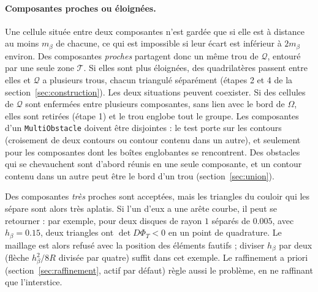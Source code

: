\documentclass[11pt,a4paper]{article}
\begin{document}
\paragraph{Composantes proches ou éloignées.} Une cellule située entre deux
composantes n'est gardée que si elle est à distance au moins $m_\beta$ de
chacune, ce qui est impossible si leur écart est inférieur à $2 m_\beta$
environ. Des composantes \emph{proches} partagent donc un même trou de
$\mathcal{Q}$, entouré par une seule zone $\mathcal{T}$. Si elles sont plus
éloignées, des quadrilatères passent entre elles et $\mathcal{Q}$ a
plusieurs trous, chacun triangulé séparément (étapes 2 et 4 de la
section~\ref{sec:construction}). Les deux situations peuvent coexister. Si
des cellules de $\mathcal{Q}$ sont enfermées entre plusieurs composantes,
sans lien avec le bord de $\Omega$, elles sont retirées (étape 1) et le trou
englobe tout le groupe. Les composantes d'un \texttt{MultiObstacle} doivent
être disjointes : le test porte sur les contours (croisement de deux
contours ou contour contenu dans un autre), et seulement pour les
composantes dont les boîtes englobantes se rencontrent. Des obstacles qui se
chevauchent sont d'abord réunis en une seule composante, et un contour
contenu dans un autre peut être le bord d'un trou
(section~\ref{sec:union}).

Des composantes \emph{très} proches sont acceptées, mais les triangles du
couloir qui les sépare sont alors très aplatis. Si l'un d'eux a une arête
courbe, il peut se retourner : par exemple, pour deux disques de rayon $1$
séparés de $0.005$, avec $h_\beta = 0.15$, deux triangles ont
$\det D\Phi_T < 0$ en un point de quadrature. Le maillage est alors refusé avec
la position des éléments fautifs ; diviser $h_\beta$ par deux (flèche
$h_\beta^2 / 8R$ divisée par quatre) suffit dans cet exemple. Le raffinement
a priori (section~\ref{sec:raffinement}, actif par défaut) règle aussi le
problème, en ne raffinant que l'interstice.
\end{document}
